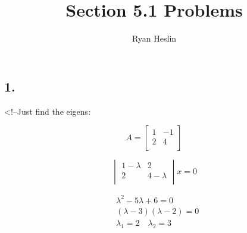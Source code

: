 \documentclass[
]{article}
\title{Section 5.1 Problems}
\author{Ryan Heslin}
\date{}
\begin{document}
\maketitle

\newcommand{\abcd}{\begin{bmatrix}a&b\\
c&d\end{bmatrix}}

\newcommand{\m}[1]{\begin{bmatrix}#1\end{bmatrix}}

\newcommand{\vect}[1]{\begin{pmatrix}#1\end{pmatrix}}

\newcommand{\meq}[1]{\begin{split}#1\end{split}}

\newcommand{\bym}[1]{#1\times{m}}

\newcommand{\nby}[1]{n\times{#1}}

\newcommand{\subsp}[2]{\Bigg\{\begin{bmatrix}#1\end{bmatrix}:#2\Bigg\}}

\newcommand{\proj}[2]{\text{proj}_#1(#2)}

\newcommand{\refl}[2]{\text{refl}_#1(#2)}

\newcommand{\sumn}{\sum_{i=1}^n}

\newcommand{\dotsn}[5]{#1_{1}#3_{1}#5{#1}_{2}#3_{2}{#5}\dots{#5}#1_{#2}#3_{#4}}

\hypertarget{section}{%
\subsection{1.}\label{section}}

\textless!--Just find the eigens:

\[A = \begin{bmatrix}
  1 & -1\\
  2 & 4\\
\end{bmatrix}\]

\[
  \begin{vmatrix}
    1 - \lambda & 2\\
    2 & 4 - \lambda\\
  \end{vmatrix}x = 0
\]

\[
  \begin{aligned}
    & \lambda^2 -5\lambda +6 = 0\\
    & (\lambda -3)(\lambda -2) = 0\\
    & \lambda_1 = 2 \quad \lambda_2 = 3
  \end{aligned}
\]
\end{document}
